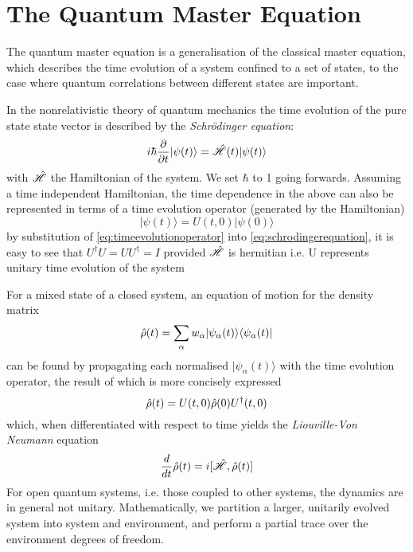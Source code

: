 \section{The Quantum Master Equation}
The quantum master equation is a generalisation of the classical master equation, which describes the time evolution of a system confined to a set of states, to the case where quantum correlations between different states are important. 

In the nonrelativistic theory of quantum mechanics the time evolution of the pure state state vector is described by the \emph{Schr\"odinger equation}:
\begin{equation}
        i\hbar \pdv{t} |\psi(t)\rangle = \hat{\mathscr{H}}(t) |\psi(t) \rangle
        \label{eq:schrodingerequation}
\end{equation}
with $\hat{\mathscr{H}}$ the Hamiltonian of the system.
We set $\hbar$ to 1 going forwards. 
Assuming a time independent Hamiltonian, the time dependence in the above can also be represented in terms of a time evolution operator (generated by the Hamiltonian)
\begin{equation}
        |\psi(t) \rangle = U(t, 0) | \psi(0) \rangle 
        \label{eq:timeevolutionoperator}
\end{equation}
by substitution of \cref{eq:timeevolutionoperator} into \ref{eq:schrodingerequation}, it is easy to see that $U^{\dagger}U = UU^\dagger = I$ provided $\hat{\mathscr{H}}$ is hermitian i.e. U represents unitary time evolution of the system

For a mixed state of a closed system, an equation of motion for the density matrix
\begin{equation}
	\hat{\rho} (t) = \sum_\alpha w_{\alpha} |\psi_\alpha (t) \rangle \langle \psi_\alpha (t) |
\end{equation}
can be found by propagating each normalised $| \psi_\alpha (t) \rangle$ with the time evolution operator, the result of which is more concisely expressed
\begin{equation}
	\hat{\rho} (t) = U(t, 0)\hat{\rho} (0) U^\dagger (t, 0)
\end{equation}
which, when differentiated with respect to time yields the \emph{Liouville-Von Neumann} equation
\begin{equation}
	\frac{d}{dt}\hat{\rho}(t) = i [\hat{\mathscr{H}}, \hat{\rho} (t) ]
\end{equation}
For open quantum systems, i.e. those coupled to other systems, the dynamics are in general not unitary. 
Mathematically, we partition a larger, unitarily evolved system into system and environment, and perform a partial trace over the environment degrees of freedom.

